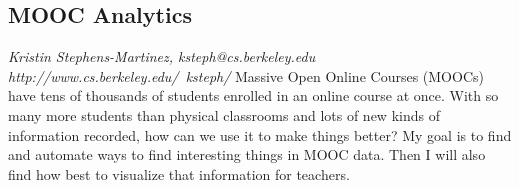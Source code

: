\documentclass[foldmark,10pt,a4paper,notumble]{leaflet}
\begin{document}
\subsection{MOOC Analytics}
\emph{Kristin Stephens-Martinez, ksteph@cs.berkeley.edu}\\
\emph{http://www.cs.berkeley.edu/~ksteph/}
Massive Open Online Courses (MOOCs) have tens of thousands of students enrolled in an online course at once. With so many more students than physical classrooms and lots of new kinds of information recorded, how can we use it to make things better? My goal is to find and automate ways to find interesting things in MOOC data. Then I will also find how best to visualize that information for teachers.
\end{document}
